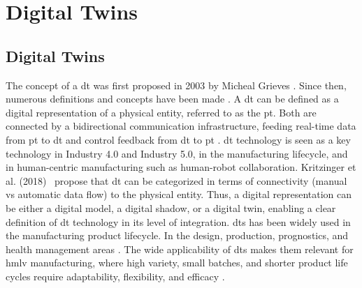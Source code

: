\section{Digital Twins}\label{sec:digital-twins}

\subsection{Digital Twins}
The concept of a \ac{dt} was first proposed in 2003 by Micheal Grieves \cite{TAO2019653}.
Since then, numerous definitions and concepts have been made \cite{LIU2021346}.
A \ac{dt} can be defined as a digital representation of a physical entity, referred to as the \ac{pt}.
Both are connected by a bidirectional communication infrastructure, feeding real-time data from \ac{pt} to \ac{dt} and control feedback from \ac{dt} to \ac{pt} \cite{Larsen2024}.
\ac{dt} technology is seen as a key technology in Industry 4.0 and Industry 5.0, in the manufacturing lifecycle, and in human-centric manufacturing such as human-robot collaboration.
Kritzinger et al. (2018)~\cite{KRITZINGER20181016} propose that \ac{dt} can be categorized in terms of connectivity (manual vs automatic data flow) to the physical entity.
Thus, a digital representation can be either a digital model, a digital shadow, or a digital twin, enabling a clear definition of \ac{dt} technology in its level of integration.
\ac{dt}s has been widely used in the manufacturing product lifecycle.
In the design, production, prognostics, and health management areas \cite{DT8477101}.
The wide applicability of \ac{dt}s makes them relevant for \ac{hmlv} manufacturing, where high variety, small batches, and shorter product life cycles require adaptability, flexibility, and efficacy \cite{app13031687}.



